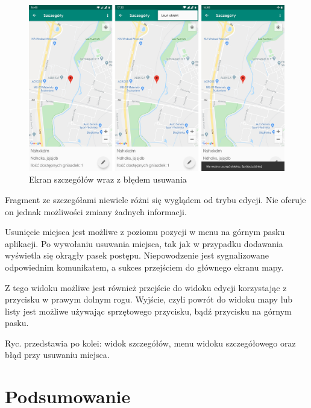 \documentclass[polish,polish,a4paper,12pt]{article}
\let\sectioncmd\section
\renewcommand{\section}{\clearpage\sectioncmd}
\begin{document}
	\begin{figure}[H]
		\centering
		\includegraphics[width = \textwidth]{screenshot-detail}
		\caption{Ekran szczegółów wraz z błędem usuwania}
		\label{fig:screenshot-detail}
	\end{figure}

	Fragment ze szczegółami niewiele różni się wyglądem od trybu edycji. Nie oferuje on jednak możliwości zmiany żadnych informacji.

	Usunięcie miejsca jest możliwe z poziomu pozycji w menu na górnym pasku aplikacji. Po wywołaniu usuwania miejsca, tak jak w przypadku dodawania wyświetla się okrągły pasek postępu. Niepowodzenie jest sygnalizowane odpowiednim komunikatem, a sukces przejściem do głównego ekranu mapy.

	Z tego widoku możliwe jest również przejście do widoku edycji korzystając z przycisku w prawym dolnym rogu. Wyjście, czyli powrót do widoku mapy lub listy jest możliwe używając sprzętowego przycisku, bądź przycisku na górnym pasku.

	Ryc.  przedstawia po kolei: widok szczegółów, menu widoku szczegółowego oraz błąd przy usuwaniu miejsca.

\section{Podsumowanie}\label{summary}

\printbibliography[heading=bibintoc,title={Literatura}]

\renewcommand{\section}{\sectioncmd}
\clearpage

\listoffigures

\listoflistings
\end{document}
